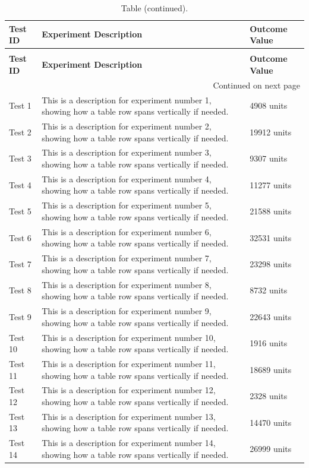 \begin{longtable}{ p{} p{} p{} }
\caption{A sample long table spanning multiple pages.} \label{tab:multipage-example} \\
\toprule
\textbf{Test ID} & \textbf{Experiment Description} & \textbf{Outcome Value} \\
\midrule
\endfirsthead
\caption*{Table \thetable{} (continued).} \\
\toprule
\textbf{Test ID} & \textbf{Experiment Description} & \textbf{Outcome Value} \\
\midrule
\endhead

\midrule
\multicolumn{3}{r}{{Continued on next page}} \\
\midrule
\endfoot

\bottomrule
\endlastfoot
Test 1 & This is a description for experiment number 1, showing how a table row spans vertically if needed. & 4908 units \\
Test 2 & This is a description for experiment number 2, showing how a table row spans vertically if needed. & 19912 units \\
Test 3 & This is a description for experiment number 3, showing how a table row spans vertically if needed. & 9307 units \\
Test 4 & This is a description for experiment number 4, showing how a table row spans vertically if needed. & 11277 units \\
Test 5 & This is a description for experiment number 5, showing how a table row spans vertically if needed. & 21588 units \\
Test 6 & This is a description for experiment number 6, showing how a table row spans vertically if needed. & 32531 units \\
Test 7 & This is a description for experiment number 7, showing how a table row spans vertically if needed. & 23298 units \\
Test 8 & This is a description for experiment number 8, showing how a table row spans vertically if needed. & 8732 units \\
Test 9 & This is a description for experiment number 9, showing how a table row spans vertically if needed. & 22643 units \\
Test 10 & This is a description for experiment number 10, showing how a table row spans vertically if needed. & 1916 units \\
Test 11 & This is a description for experiment number 11, showing how a table row spans vertically if needed. & 18689 units \\
Test 12 & This is a description for experiment number 12, showing how a table row spans vertically if needed. & 2328 units \\
Test 13 & This is a description for experiment number 13, showing how a table row spans vertically if needed. & 14470 units \\
Test 14 & This is a description for experiment number 14, showing how a table row spans vertically if needed. & 26999 units
\end{longtable}
